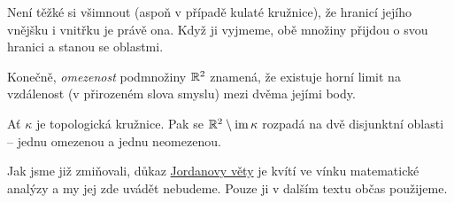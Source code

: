 Není těžké si všimnout (aspoň v případě kulaté kružnice), že hranicí jejího
vnějšku i vnitřku je právě ona. Když ji vyjmeme, obě množiny přijdou o svou
hranici a stanou se oblastmi.

Konečně, \emph{omezenost} podmnožiny $\mathbb{R}^2$ znamená, že existuje horní limit na
vzdálenost (v přirozeném slova smyslu) mezi dvěma jejími body.

\begin{theorem}
 \label{thm:jordanova-o-kruznici}
 Ať $\kappa$ je topologická kružnice. Pak se $\mathbb{R}^2 \setminus \operatorname{im} \kappa$
 rozpadá na dvě disjunktní oblasti -- jednu omezenou a jednu neomezenou.
\end{theorem}

Jak jsme již zmiňovali, důkaz \hyperref[thm:jordanova-o-kruznici]{Jordanovy
věty} je kvítí ve vínku matematické analýzy a my jej zde uvádět nebudeme. Pouze
ji v dalším textu občas použijeme.


